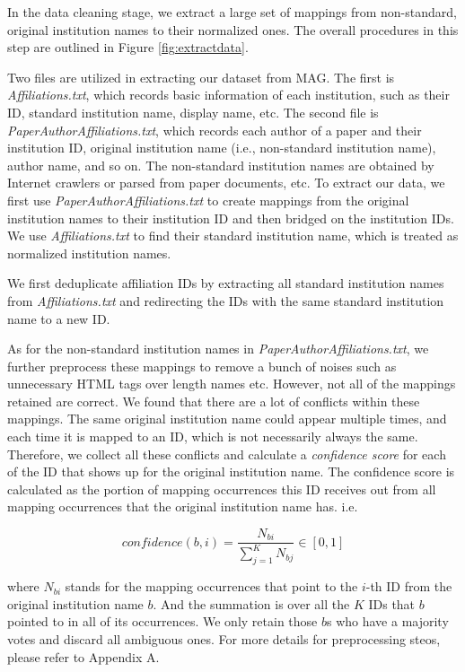 \documentclass{article}
\begin{document}
In the data cleaning stage, we extract a large set of mappings from non-standard, original institution names to their normalized ones. The overall procedures in this step are outlined in Figure \ref{fig:extractdata}. 

Two files are utilized in extracting our dataset from MAG. The first is \textit{Affiliations.txt}, which records basic information of each institution, such as their ID, standard institution name, display name, etc. The second file is \textit{PaperAuthorAffiliations.txt}, which records each author of a paper and their institution ID, original institution name (i.e., non-standard institution name), author name, and so on. The non-standard institution names are obtained by Internet crawlers or parsed from paper documents, etc. To extract our data, we first use \textit{PaperAuthorAffiliations.txt} to create mappings from the original institution names to their institution ID and then bridged on the institution IDs. We use \textit{Affiliations.txt} to find their standard institution name, which is treated as normalized institution names. 

We first deduplicate affiliation IDs by extracting all standard institution names from \textit{Affiliations.txt} and redirecting the IDs with the same standard institution name to a new ID.

As for the non-standard institution names in \textit{PaperAuthorAﬀiliations.txt}, we further preprocess these mappings to remove a bunch of noises such as unnecessary HTML tags over length names etc. However, not all of the mappings retained are correct. We found that there are a lot of conflicts within these mappings. The same original institution name could appear multiple times, and each time it is mapped to an ID, which is not necessarily always the same. Therefore, we collect all these conflicts and calculate a \textit{confidence score} for each of the ID that shows up for the original institution name. The confidence score is calculated as the portion of mapping occurrences this ID receives out from all mapping occurrences that the original institution name has. i.e. 

$$
confidence(b, i) = \frac{N_{bi}}{\sum_{j=1}^{K}N_{bj}}\in [0, 1]
$$

where $N_{bi}$ stands for the mapping occurrences that point to the $i$-th ID from the original institution name $b$. And the summation is over all the $K$ IDs that $b$ pointed to in all of its occurrences. We only retain those $b$s who have a majority votes and discard all ambiguous ones. For more details for preprocessing steos, please refer to Appendix A.
\end{document}
